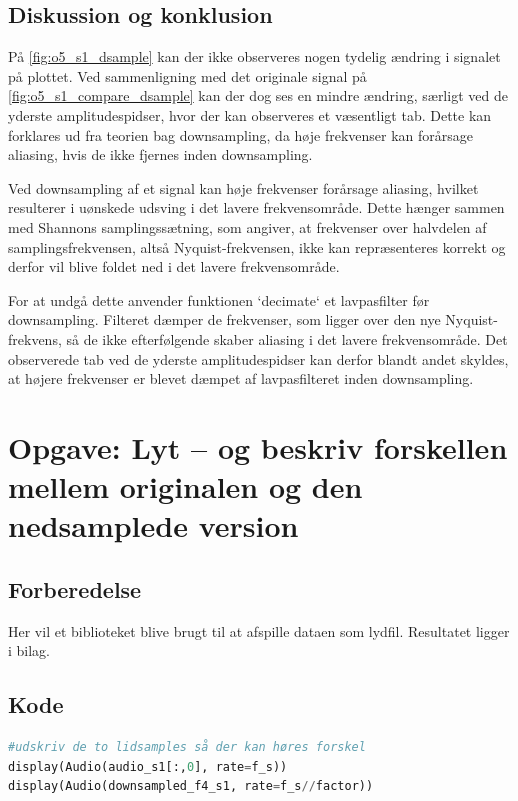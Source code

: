 \documentclass[11pt,a4paper]{report}
\begin{document}
\subsection{Diskussion og konklusion}
På \autoref{fig:o5_s1_dsample} kan der ikke observeres nogen tydelig ændring i signalet på plottet. Ved sammenligning med det originale signal på \autoref{fig:o5_s1_compare_dsample} kan der dog ses en mindre ændring, særligt ved de yderste amplitudespidser, hvor der kan observeres et væsentligt tab. Dette kan forklares ud fra teorien bag downsampling, da høje frekvenser kan forårsage aliasing, hvis de ikke fjernes inden downsampling.

Ved downsampling af et signal kan høje frekvenser forårsage aliasing, hvilket resulterer i uønskede udsving i det lavere frekvensområde. Dette hænger sammen med Shannons samplingssætning, som angiver, at frekvenser over halvdelen af samplingsfrekvensen, altså Nyquist-frekvensen, ikke kan repræsenteres korrekt og derfor vil blive foldet ned i det lavere frekvensområde.

For at undgå dette anvender funktionen `decimate` et lavpasfilter før downsampling. Filteret dæmper de frekvenser, som ligger over den nye Nyquist-frekvens, så de ikke efterfølgende skaber aliasing i det lavere frekvensområde. Det observerede tab ved de yderste amplitudespidser kan derfor blandt andet skyldes, at højere frekvenser er blevet dæmpet af lavpasfilteret inden downsampling.


\newpage

\section{Opgave: Lyt – og beskriv forskellen mellem originalen og den nedsamplede version}

\subsection{Forberedelse}
Her vil et biblioteket blive brugt til at afspille dataen som lydfil. Resultatet ligger i bilag.

\subsection{Kode}
\begin{lstlisting}[language=Python]
#udskriv de to lidsamples så der kan høres forskel
display(Audio(audio_s1[:,0], rate=f_s))
display(Audio(downsampled_f4_s1, rate=f_s//factor))
\end{lstlisting}
\end{document}
